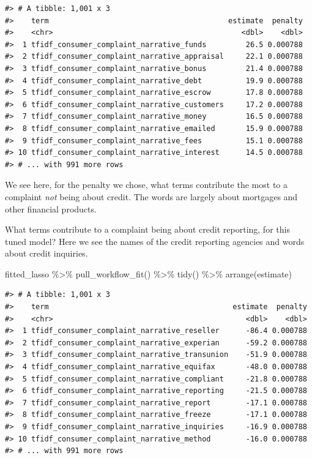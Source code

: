\documentclass[
]{krantz}
\makeatletter
\newenvironment{Shaded}{\begin{snugshade}}{\end{snugshade}}
\newcommand{\FunctionTok}[1]{\textcolor[rgb]{0.00,0.00,0.00}{#1}}
\newcommand{\NormalTok}[1]{#1}
\newcommand{\SpecialCharTok}[1]{\textcolor[rgb]{0.00,0.00,0.00}{#1}}
\newenvironment{kframe}{%
\medskip{}
\setlength{\fboxsep}{.8em}
 \def\at@end@of@kframe{}%
 \ifinner\ifhmode%
  \def\at@end@of@kframe{\end{minipage}}%
  \begin{minipage}{\columnwidth}%
 \fi\fi%
 \def\FrameCommand##1{\hskip\@totalleftmargin \hskip-\fboxsep
 \colorbox{shadecolor}{##1}\hskip-\fboxsep
     \hskip-\linewidth \hskip-\@totalleftmargin \hskip\columnwidth}%
 \MakeFramed {\advance\hsize-\width
   \@totalleftmargin\z@ \linewidth\hsize
   \@setminipage}}%
 {\par\unskip\endMakeFramed%
 \at@end@of@kframe}
\renewenvironment{Shaded}{\begin{kframe}}{\end{kframe}}
\makeatother
\begin{document}
\begin{verbatim}
#> # A tibble: 1,001 x 3
#>    term                                         estimate  penalty
#>    <chr>                                           <dbl>    <dbl>
#>  1 tfidf_consumer_complaint_narrative_funds         26.5 0.000788
#>  2 tfidf_consumer_complaint_narrative_appraisal     22.1 0.000788
#>  3 tfidf_consumer_complaint_narrative_bonus         21.4 0.000788
#>  4 tfidf_consumer_complaint_narrative_debt          19.9 0.000788
#>  5 tfidf_consumer_complaint_narrative_escrow        17.8 0.000788
#>  6 tfidf_consumer_complaint_narrative_customers     17.2 0.000788
#>  7 tfidf_consumer_complaint_narrative_money         16.5 0.000788
#>  8 tfidf_consumer_complaint_narrative_emailed       15.9 0.000788
#>  9 tfidf_consumer_complaint_narrative_fees          15.1 0.000788
#> 10 tfidf_consumer_complaint_narrative_interest      14.5 0.000788
#> # ... with 991 more rows
\end{verbatim}

We see here, for the penalty we chose, what terms contribute the most to a complaint \emph{not} being about credit. The words are largely about mortgages and other financial products.

What terms contribute to a complaint being about credit reporting, for this tuned model? Here we see the names of the credit reporting agencies and words about credit inquiries.

\begin{Shaded}
\begin{Highlighting}[]
\NormalTok{fitted\_lasso }\SpecialCharTok{\%\textgreater{}\%}
  \FunctionTok{pull\_workflow\_fit}\NormalTok{() }\SpecialCharTok{\%\textgreater{}\%}
  \FunctionTok{tidy}\NormalTok{() }\SpecialCharTok{\%\textgreater{}\%}
  \FunctionTok{arrange}\NormalTok{(estimate)}
\end{Highlighting}
\end{Shaded}

\begin{verbatim}
#> # A tibble: 1,001 x 3
#>    term                                          estimate  penalty
#>    <chr>                                            <dbl>    <dbl>
#>  1 tfidf_consumer_complaint_narrative_reseller      -86.4 0.000788
#>  2 tfidf_consumer_complaint_narrative_experian      -59.2 0.000788
#>  3 tfidf_consumer_complaint_narrative_transunion    -51.9 0.000788
#>  4 tfidf_consumer_complaint_narrative_equifax       -48.0 0.000788
#>  5 tfidf_consumer_complaint_narrative_compliant     -21.8 0.000788
#>  6 tfidf_consumer_complaint_narrative_reporting     -21.5 0.000788
#>  7 tfidf_consumer_complaint_narrative_report        -17.1 0.000788
#>  8 tfidf_consumer_complaint_narrative_freeze        -17.1 0.000788
#>  9 tfidf_consumer_complaint_narrative_inquiries     -16.9 0.000788
#> 10 tfidf_consumer_complaint_narrative_method        -16.0 0.000788
#> # ... with 991 more rows
\end{verbatim}
\end{document}
